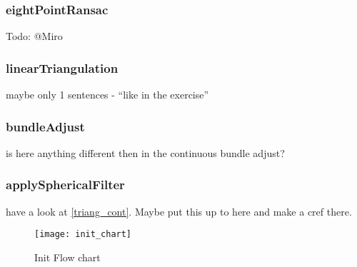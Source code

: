 \subsubsection{eightPointRansac}
Todo: @Miro

\subsubsection{linearTriangulation}
maybe only 1 sentences - ``like in the exercise''

\subsubsection{bundleAdjust}
is here anything different then in the continuous bundle adjust?

\subsubsection{applySphericalFilter}
have a look at \cref{triang_cont}. Maybe put this up to here and make a cref there.

\begin{figure}[ht]
	\centering
	\texttt{[image: init\_chart]}
	\caption{Init Flow chart}
	\label{img_flow_init}
\end{figure}
